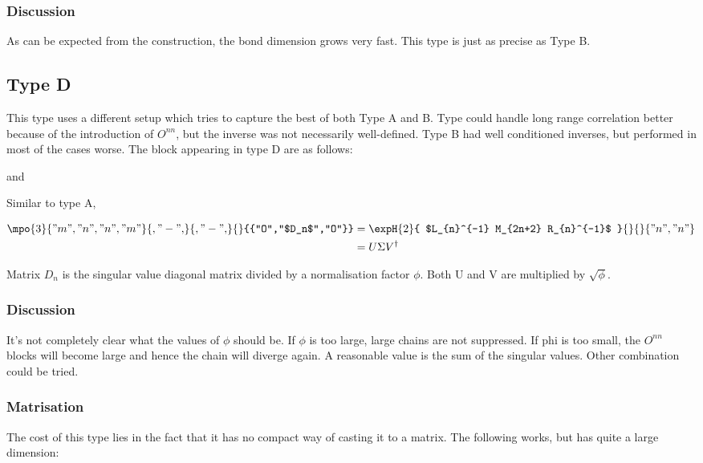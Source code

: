 \subsubsection{Discussion}
As can be expected from the construction, the bond dimension grows very fast. This type is just as precise as Type B.

\subsection{Type D}

This type uses a different setup which tries to capture the best of both Type A and B. Type  could handle long range correlation better because of the introduction of $O^{n n}$, but the inverse was not necessarily well-defined. Type B had well conditioned inverses, but performed in most of the cases worse. The block appearing in type D are as follows:

 and 

Similar to type A,

\def \rhs{\expH{2}{ $L_{n}^{-1}  M_{2n+2}  R_{n}^{-1}$ }{}{}{{"n","n"}}  }
\begin{equation}
    \begin{split}
        \mpo{3}{{"m","n","n","m"}}{{,"-",}}{{,"-",}}{}{{"O","$D_n$","O"}} &= \rhs \\
        &= U \Sigma V^{ \dagger}
    \end{split}
    \label{eq_nmn_level}
\end{equation}

Matrix $D_n$ is the singular value diagonal matrix divided by a normalisation factor $\phi$. Both U and V are multiplied by $  \sqrt{\phi} $.

\subsubsection{Discussion}
It's not completely clear what the values of $\phi$ should be.  If $\phi$ is too large, large chains are not suppressed. If phi is too small, the $O^{n n}$ blocks will become large and hence the chain will diverge again. A reasonable value is the sum of the singular values. Other combination could be tried.

\subsubsection{Matrisation}
The cost of this type lies in the fact that it has no compact way of casting it to a matrix. The following works, but has quite a large dimension:

